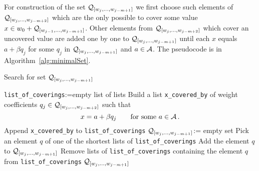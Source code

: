 \begin{upravit}
For construction of the set $\mathcal{Q}_{[w_j,\dots, w_{j-m+1}]}$ we first choose such elements of $\mathcal{Q}_{[w_j,\dots, w_{j-m+2}]}$ which are the only possible to cover some value $x \in w_0 + \mathcal{Q}_{[w_{j-1},\dots, w_{j-m+1}]}$. Other elements from $\mathcal{Q}_{[w_j,\dots, w_{j-m+2}]}$ which cover an uncovered value are added one by one to $\mathcal{Q}_{[w_j,\dots, w_{j-m+1}]}$ until each $x$ equals $a+\beta q_j$ for some $q_j$ in $\mathcal{Q}_{[w_j,\dots, w_{j-m+1}]}$ and $a\in\mathcal{A}$. The pseudocode is in Algorithm~\ref{alg:minimalSet}. 

\begin{algorithm}
  \caption{Search for set $\mathcal{Q}_{[w_j,\dots, w_{j-m+1}]}$ }
    \label{alg:minimalSet}
  \begin{algorithmic}[1]
    \STATE \verb+list_of_coverings+:=empty list of lists
        \STATE Build a list \verb+x_covered_by+ of weight coefficients $q_j \in \mathcal{Q}_{[w_j,\dots, w_{j-m+2}]}$ such that 
        $$
        x=a+ \beta q_j \qquad\text{for some } a\in\mathcal{A}\,.
        $$ 
        \vspace{-20pt}
        \STATE Append \verb+x_covered_by+ to \verb+list_of_coverings+
    \ENDFOR
    \STATE $\mathcal{Q}_{[w_j,\dots, w_{j-m+1}]}$:= empty set
        \STATE Pick an element $q$ of one of the shortest lists of \verb+list_of_coverings+ 
            \label{line:pickElement}
        \STATE Add the element $q$ to $\mathcal{Q}_{[w_j,\dots, w_{j-m+1}]}$
        \STATE Remove lists of \verb+list_of_coverings+ containing the element $q$ from \verb+list_of_coverings+
    \ENDWHILE
    \RETURN $\mathcal{Q}_{[w_j,\dots, w_{j-m+1}]}$
  \end{algorithmic}
\end{algorithm}



\end{upravit}
